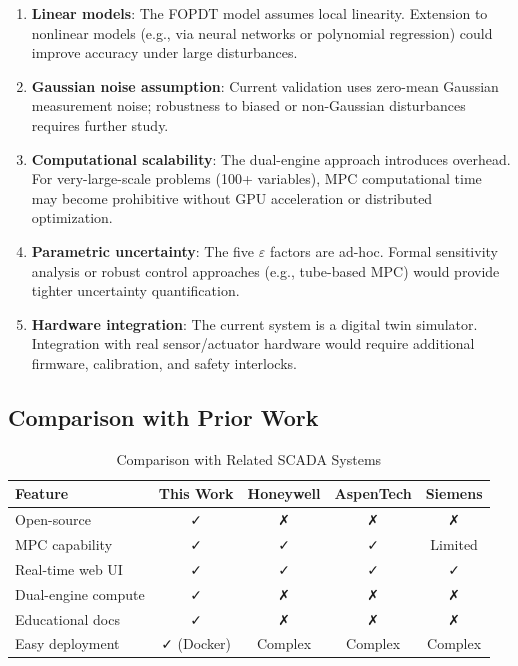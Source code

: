 \documentclass[conference]{IEEEtran}
\begin{document}
\begin{enumerate}
\item \textbf{Linear models}: The FOPDT model assumes local linearity. Extension to nonlinear models (e.g., via neural networks or polynomial regression) could improve accuracy under large disturbances.

\item \textbf{Gaussian noise assumption}: Current validation uses zero-mean Gaussian measurement noise; robustness to biased or non-Gaussian disturbances requires further study.

\item \textbf{Computational scalability}: The dual-engine approach introduces overhead. For very-large-scale problems (100+ variables), MPC computational time may become prohibitive without GPU acceleration or distributed optimization.

\item \textbf{Parametric uncertainty}: The five $\varepsilon$ factors are ad-hoc. Formal sensitivity analysis or robust control approaches (e.g., tube-based MPC) would provide tighter uncertainty quantification.

\item \textbf{Hardware integration}: The current system is a digital twin simulator. Integration with real sensor/actuator hardware would require additional firmware, calibration, and safety interlocks.
\end{enumerate}

\subsection{Comparison with Prior Work}

\begin{table}[h]
\centering
\caption{Comparison with Related SCADA Systems}
\begin{tabular}{|l|c|c|c|c|}
\hline
\textbf{Feature} & \textbf{This Work} & \textbf{Honeywell} & \textbf{AspenTech} & \textbf{Siemens} \\
\hline
Open-source & ✓ & ✗ & ✗ & ✗ \\
MPC capability & ✓ & ✓ & ✓ & Limited \\
Real-time web UI & ✓ & ✓ & ✓ & ✓ \\
Dual-engine compute & ✓ & ✗ & ✗ & ✗ \\
Educational docs & ✓ & ✗ & ✗ & ✗ \\
Easy deployment & ✓ (Docker) & Complex & Complex & Complex \\
\hline
\end{tabular}
\end{table}
\end{document}
